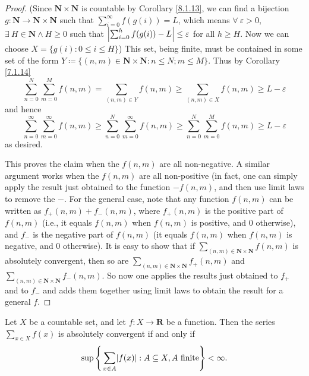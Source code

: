 \begin{proof}
(Since \(\mathbf{N} \times \mathbf{N}\) is countable by Corollary \ref{8.1.13}, we can find a bijection \(g : \mathbf{N} \to \mathbf{N} \times \mathbf{N}\) such that \(\sum_{i = 0}^\infty f(g(i)) = L\), which means \(\forall\ \varepsilon > 0\), \(\exists\ H \in \mathbf{N} \land H \geq 0\) such that \(\abs*{\sum_{i = 0}^h f(g(i)) - L} \leq \varepsilon\) for all \(h \geq H\).
Now we can choose \(X = \{g(i) : 0 \leq i \leq H\}\))
This set, being finite, must be contained in some set of the form \(Y \coloneqq \{(n,m) \in \mathbf{N} \times \mathbf{N} : n \leq N; m \leq M \}\).
Thus by Corollary \ref{7.1.14}
\[
    \sum_{n = 0}^N \sum_{m = 0}^M f(n, m) = \sum_{(n, m) \in Y} f(n, m) \geq \sum_{(n, m) \in X} f(n, m) \geq L - \varepsilon
\]
and hence
\[
    \sum_{n = 0}^\infty \sum_{m = 0}^\infty f(n, m) \geq \sum_{n = 0}^N \sum_{m = 0}^\infty f(n, m) \geq \sum_{n = 0}^N \sum_{m = 0}^M f(n, m) \geq L - \varepsilon
\]
as desired.

This proves the claim when the \(f(n, m)\) are all non-negative.
A similar argument works when the \(f(n, m)\) are all non-positive
(in fact, one can simply apply the result just obtained to the function \(-f(n, m)\), and then use limit laws to remove the \(-\).
For the general case, note that any function \(f(n, m)\) can be written as \(f_+(n, m) + f_-(n, m)\), where \(f_+(n, m)\) is the positive part of \(f(n, m)\)
(i.e., it equals \(f(n, m)\) when \(f(n, m)\) is positive, and \(0\) otherwise),
and \(f_-\) is the negative part of \(f(n, m)\)
(it equals \(f(n, m)\) when \(f(n, m)\) is negative, and \(0\) otherwise).
It is easy to show that if \(\sum_{(n, m) \in \mathbf{N} \times \mathbf{N}} f(n, m)\) is absolutely convergent, then so are \(\sum_{(n, m) \in \mathbf{N} \times \mathbf{N}} f_+(n, m)\) and \(\sum_{(n, m) \in \mathbf{N} \times \mathbf{N}} f_-(n, m)\).
So now one applies the results just obtained to \(f_+\) and to \(f_-\) and adds them together using limit laws to obtain the result for a general \(f\).
\end{proof}

\begin{lemma}\label{8.2.3}
Let \(X\) be a countable set, and let \(f : X \to \mathbf{R}\) be a function.
Then the series \(\sum_{x \in X} f(x)\) is absolutely convergent if and only if
\[
    \sup\Bigg\{\sum_{x \in A} \abs*{f(x)} : A \subseteq X, A \text{ finite}\Bigg\} < \infty.
\]
\end{lemma}

